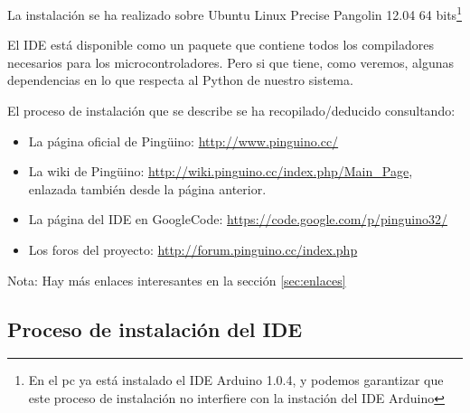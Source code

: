 \documentclass[12pt,a4paper,twoside,DIV=15]{scrartcl}
\begin{document}
La instalación se ha realizado sobre Ubuntu Linux Precise Pangolin
12.04 64 bits\footnote{En el pc ya está instalado el IDE Arduino 1.0.4, y
  podemos garantizar que este proceso de instalación no interfiere con
  la instación del IDE Arduino}

El IDE está disponible como un paquete que contiene todos los
compiladores necesarios para los microcontroladores. Pero si que
tiene, como veremos, algunas dependencias en lo que respecta al Python
de nuestro sistema.

El proceso de instalación que se describe se ha recopilado/deducido
consultando:

\begin{itemize}
\item La página oficial de Pingüino: \url{http://www.pinguino.cc/}
\item La wiki de Pingüino:
  \url{http://wiki.pinguino.cc/index.php/Main_Page}, enlazada también
  desde la página anterior.
\item La página del IDE en GoogleCode: \url{https://code.google.com/p/pinguino32/}
\item Los foros del proyecto: \url{http://forum.pinguino.cc/index.php}
\end{itemize}

Nota: Hay más enlaces interesantes en la sección \ref{sec:enlaces} 

\subsection{Proceso de instalación del IDE}
\label{sec:proc_inst}
\end{document}
